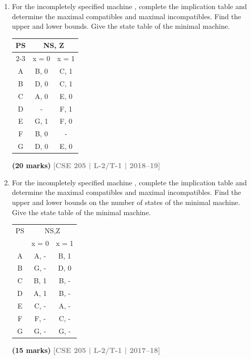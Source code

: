 \documentclass[12pt]{article}
\newcommand{\yr}[1]{\hfill\textcolor{gray}{\small\textbf{[#1]}}}
\newcommand{\mk}[1]{\textcolor{orange!70!black}{\small\textbf{(#1 marks)}}}
\begin{document}
\begin{enumerate}
\mk{25} \yr{CSE 205 | L-2/T-1 | 2019--20}



\item For the incompletely specified machine , complete the implication table and determine the maximal compatibles and maximal incompatibles. Find the upper and lower bounds. Give the state table of the minimal machine.

\begin{center}
  \begin{tabular}{|c|c|c|}
\hline
\multirow{2}{*}{PS} & \multicolumn{2}{c|}{NS, Z} \\ \cline{2-3} 
 & x = 0 & x = 1 \\ \hline
A & B, 0 & C, 1 \\ \hline
B & D, 0 & C, 1 \\ \hline
C & A, 0 & E, 0 \\ \hline
D & - & F, 1 \\ \hline
E & G, 1 & F, 0 \\ \hline
F & B, 0 & - \\ \hline
G & D, 0 & E, 0 \\ \hline
\end{tabular}
\end{center}

\mk{20} \yr{CSE 205 | L-2/T-1 | 2018--19}



\item For the incompletely specified machine , complete the implication table and determine the maximal compatibles and maximal incompatibles. Find the upper and lower bounds on the number of states of the minimal machine. Give the state table of the minimal machine.
\begin{center}
  \begin{tabular}{c|cc}
PS & \multicolumn{2}{c}{NS,Z} \\
 & x = 0 & x = 1 \\
\hline
A & A, - & B, 1 \\
B & G, - & D, 0 \\
C & B, 1 & B, - \\
D & A, 1 & B, - \\
E & C, - & A, - \\
F & F, - & C, - \\
G & G, - & G, - \\
\end{tabular}
\end{center}
  
\mk{15} \yr{CSE 205 | L-2/T-1 | 2017--18}






\end{enumerate}
\end{document}
